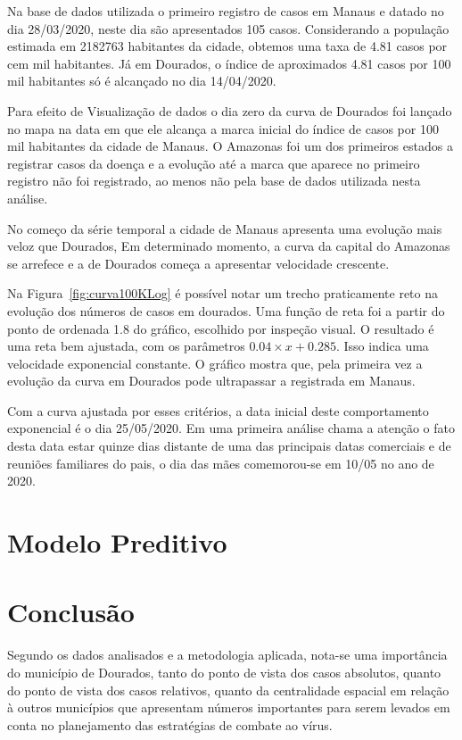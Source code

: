 \documentclass[12pt]{article}
\begin{document}
Na base de dados utilizada o primeiro registro de casos em Manaus e datado no dia 28/03/2020, neste dia são apresentados 105 casos. Considerando a população estimada em 2182763 habitantes da cidade, obtemos uma taxa de 4.81 casos por cem mil habitantes. Já em Dourados, o índice de aproximados 4.81 casos por 100 mil habitantes só é alcançado no dia 14/04/2020.

Para efeito de Visualização de dados o dia zero da curva de Dourados foi lançado no mapa na data em que ele alcança a marca inicial do índice de casos por 100 mil habitantes da cidade de Manaus. O Amazonas foi um dos primeiros estados a registrar casos da doença e a evolução até a marca que aparece no primeiro registro não foi registrado, ao menos não pela base de dados utilizada nesta análise. 


No começo da série temporal a cidade de Manaus apresenta uma evolução mais veloz que Dourados, Em determinado momento, a curva da capital do Amazonas se arrefece e a de Dourados começa a apresentar velocidade crescente.

Na Figura~\ref{fig:curva100KLog} é possível notar um trecho praticamente reto na evolução dos números de casos em dourados. Uma função de reta foi a partir do ponto de ordenada 1.8 do gráfico, escolhido por inspeção visual. O resultado é uma reta bem ajustada, com os parâmetros \(0.04 \times x + 0.285\). Isso indica uma velocidade exponencial constante. O gráfico mostra que, pela primeira vez a evolução da curva em Dourados pode ultrapassar a registrada em Manaus.

Com a curva ajustada por esses critérios, a data inicial deste comportamento exponencial é o dia 25/05/2020. Em uma primeira análise chama a atenção o fato desta data estar quinze dias distante de uma das principais datas comerciais e de reuniões familiares do pais, o dia das mães comemorou-se em 10/05 no ano de 2020. 

\section{Modelo Preditivo}



\section{Conclusão}\label{conc}

Segundo os dados analisados e a metodologia aplicada, nota-se uma importância do município de Dourados, tanto do ponto de vista dos casos absolutos, quanto do ponto de vista dos casos relativos, quanto da centralidade espacial em relação à outros municípios que apresentam números importantes para serem levados em conta no planejamento das estratégias de combate ao vírus.
\end{document}
